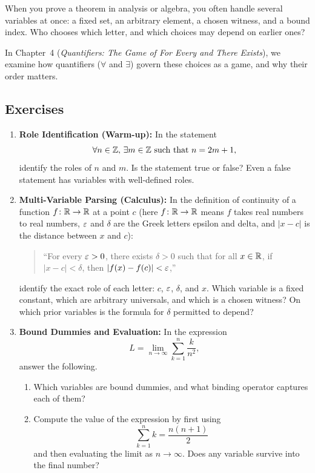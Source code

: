 When you prove a theorem in analysis or algebra, you often handle several variables at once: a fixed set, an arbitrary element, a chosen witness, and a bound index. Who chooses which letter, and which choices may depend on earlier ones?

In Chapter~4 (\emph{Quantifiers: The Game of For Every and There Exists}), we examine how quantifiers ($\forall$ and $\exists$) govern these choices as a game, and why their order matters.

\subsection{Exercises}

\begin{enumerate}
\item \textbf{Role Identification (Warm-up):} In the statement
\[
\forall n \in \mathbb{Z}, \, \exists m \in \mathbb{Z} \text{ such that } n = 2m + 1,
\]
identify the roles of $n$ and $m$. Is the statement true or false? Even a false statement has variables with well-defined roles.

\item \textbf{Multi-Variable Parsing (Calculus):} In the definition of continuity of a function $f \colon \mathbb{R} \to \mathbb{R}$ at a point $c$ (here $f \colon \mathbb{R} \to \mathbb{R}$ means $f$ takes real numbers to real numbers, $\varepsilon$ and $\delta$ are the Greek letters epsilon and delta, and $|x - c|$ is the distance between $x$ and $c$):
\begin{quote}
``For every $\varepsilon > 0$, there exists $\delta > 0$ such that for all $x \in \mathbb{R}$, if $|x - c| < \delta$, then $|f(x) - f(c)| < \varepsilon$,''
\end{quote}
identify the exact role of each letter: $c$, $\varepsilon$, $\delta$, and $x$. Which variable is a fixed constant, which are arbitrary universals, and which is a chosen witness? On which prior variables is the formula for $\delta$ permitted to depend?

\item \textbf{Bound Dummies and Evaluation:} In the expression
\[
L = \lim_{n \to \infty} \sum_{k=1}^n \frac{k}{n^2},
\]
answer the following.
\begin{enumerate}[label=(\alph*)]
\item Which variables are bound dummies, and what binding operator captures each of them?
\item Compute the value of the expression by first using
\[
\sum_{k=1}^n k = \frac{n(n+1)}{2}
\]
and then evaluating the limit as $n \to \infty$. Does any variable survive into the final number?
\end{enumerate}


\end{enumerate}
